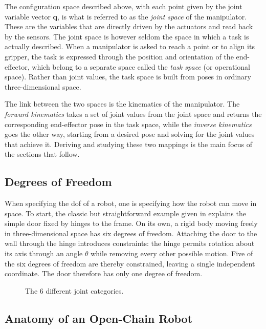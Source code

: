 The configuration space described above, with each point given by the joint
variable vector $\mathbf{q}$, is what is referred to as the \textit{joint space}
of the manipulator. These are the variables that are directly driven by the
actuators and read back by the sensors. The joint space is however seldom the
space in which a task is actually described. When a manipulator is asked to reach
a point or to align its gripper, the task is expressed through the position and
orientation of the end-effector, which belong to a separate space called the
\textit{task space} (or operational space). Rather than joint values, the task
space is built from poses in ordinary three-dimensional space.

The link between the two spaces is the kinematics of the manipulator. The
\textit{forward kinematics} takes a set of joint values from the joint space and
returns the corresponding end-effector pose in the task space, while the
\textit{inverse kinematics} goes the other way, starting from a desired pose and
solving for the joint values that achieve it. Deriving and studying these two
mappings is the main focus of the sections that follow.

\subsection{Degrees of Freedom}

When specifying the \gls{dof} of a robot, one is specifying how the robot can
move in space. To start, the classic but straightforward example given in
\cite{lynch2017modern} explains the simple door fixed by hinges to the frame.
On its own, a rigid body moving freely in three-dimensional space has six
degrees of freedom. Attaching the door to the wall through the hinge introduces
constraints: the hinge permits rotation about its axis through an angle $\theta$
while removing every other possible motion. Five of the six degrees of freedom
are thereby constrained, leaving a single independent coordinate. The door
therefore has only one degree of freedom.

\begin{figure}[ht]
  \centering
  
  \caption{The 6 different joint categories.}
  \label{fig:joints_dof}
\end{figure}

\subsection{Anatomy of an Open-Chain Robot}

